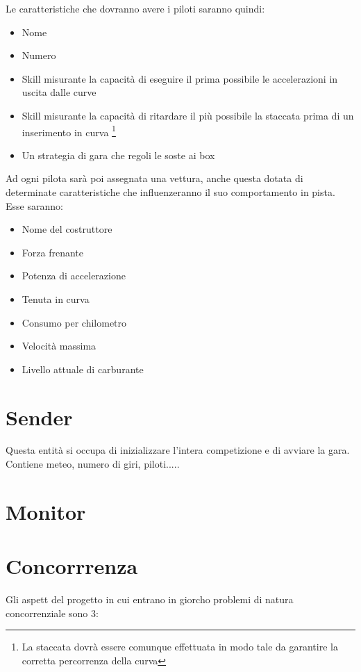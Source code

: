 \documentclass[a4paper,11pt, twoside]{book}
\begin{document}
      Le caratteristiche che dovranno avere i piloti saranno quindi:
	
	\begin{itemize}
	  \item Nome 
	  \item Numero
	  \item Skill misurante la capacità di eseguire il prima possibile le accelerazioni in uscita dalle curve
	  \item Skill misurante la capacità di ritardare il più possibile la staccata prima di un inserimento in curva 
		\footnote{La staccata dovrà essere comunque effettuata in modo tale da garantire la 
		corretta percorrenza della curva}
	  \item Un strategia di gara che regoli le soste ai box
	\end{itemize}
	
	
	Ad ogni pilota sarà poi assegnata una vettura, anche questa dotata di determinate caratteristiche che influenzeranno il suo
	comportamento in pista. Esse saranno:
	
	\begin{itemize}
	  \item Nome del costruttore
	  \item Forza frenante
	  \item Potenza di accelerazione
	  \item Tenuta in curva
	  \item Consumo per chilometro
	  \item Velocità massima
	  \item Livello attuale di carburante
	\end{itemize}
      
      

     
	
    \section{Sender}
      Questa entità si occupa di inizializzare l'intera competizione e di avviare la gara.
      Contiene meteo, numero di giri, piloti.....
      
    \section{Monitor}
  
    \section{Concorrrenza}
      Gli aspett del progetto in cui entrano in giorcho problemi di natura concorrenziale sono 3:
      
\end{document}

